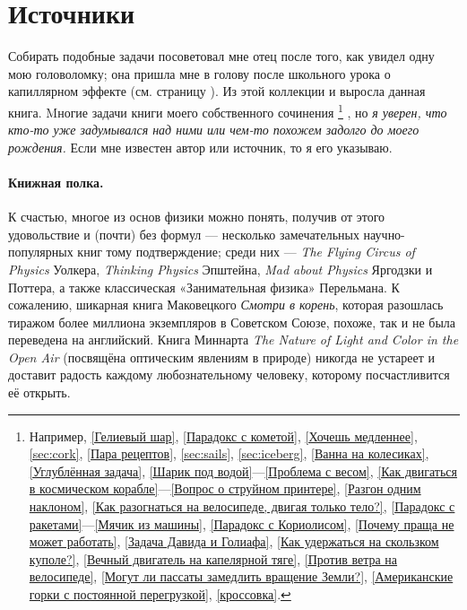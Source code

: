 \section{Источники}

Собирать подобные задачи посоветовал мне отец после того, как увидел одну мою головоломку;
она пришла мне в голову после школьного урока о капиллярном эффекте (см. страницу \pageref{Вечный двигатель на капелярной тяге}).
Из этой коллекции и выросла данная книга.
Mногие задачи книги моего собственного сочинения%
\footnote{Например,
\ref{Гелиевый шар}, \ref{Парадокс с кометой}, \ref{Хочешь медленнее},
\ref{sec:cork}, \ref{Пара рецептов}, \ref{sec:sails}, \ref{sec:iceberg},
\ref{Ванна на колесиках}, \ref{Углублённая задача}, \ref{Шарик под водой}---\ref{Проблема с весом},
\ref{Как двигаться в космическом корабле}---\ref{Вопрос о струйном принтере},
\ref{Разгон одним наклоном}, \ref{Как разогнаться на велосипеде, двигая только тело?}, \ref{Парадокс с ракетами}---\ref{Мячик из машины},
\ref{Парадокс с Кориолисом}, \ref{Почему праща не может работать}, \ref{Задача Давида и Голиафа},
\ref{Как удержаться на скользком куполе?},
\ref{Вечный двигатель на капелярной тяге},
\ref{Против ветра на велосипеде},
\ref{Могут ли пассаты замедлить вращение Земли?},
\ref{Американские горки с постоянной перегрузкой}, \ref{кроссовка}.}%
, но \emph{я уверен, что кто-то уже задумывался над ними или чем-то похожем задолго до моего рождения.}
Если мне известен автор или источник, то я его указываю.

\paragraph{Книжная полка.}
К счастью, %
многое из основ физики можно понять, получив от этого удовольствие и (почти) без формул ---
несколько замечательных научно-популярных книг тому подтверждение;
среди них — \emph{The Flying Circus of Physics} Уолкера,
\emph{Thinking Physics} Эпштейна,
\emph{Mad about Physics} Яргодзки и Поттера,
а также классическая «Занимательная физика» Перельмана.
К сожалению, шикарная книга Маковецкого \emph{Смотри в корень}, которая разошлась тиражом более миллиона экземпляров в Советском Союзе, похоже, так и не была переведена на английский.
Книга Миннарта \emph{The Nature of Light and Color in the Open Air} (посвящёна оптическим явлениям в природе) никогда не устареет и доставит радость каждому любознательному человеку, которому посчастливится её открыть.
